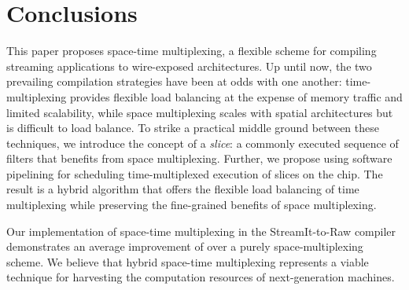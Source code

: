 \section{Conclusions}
\label{sec:conclusion}

This paper proposes space-time multiplexing, a flexible scheme for
compiling streaming applications to wire-exposed architectures.  Up
until now, the two prevailing compilation strategies have been at odds
with one another: time-multiplexing provides flexible load balancing
at the expense of memory traffic and limited scalability, while space
multiplexing scales with spatial architectures but is difficult to
load balance.  To strike a practical middle ground between these
techniques, we introduce the concept of a {\it slice}: a commonly
executed sequence of filters that benefits from space multiplexing.
Further, we propose using software pipelining for scheduling
time-multiplexed execution of slices on the chip.  The result is a
hybrid algorithm that offers the flexible load balancing of time
multiplexing while preserving the fine-grained benefits of space
multiplexing.


Our implementation of space-time multiplexing in the StreamIt-to-Raw
compiler demonstrates an average improvement of  over a
purely space-multiplexing scheme.  We believe that hybrid space-time
multiplexing represents a viable technique for harvesting the
computation resources of next-generation machines.
